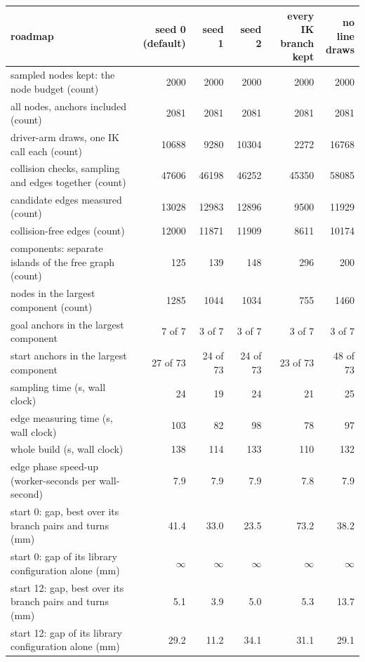 \begin{tabular}{@{}>{\raggedright\arraybackslash}p{6.2cm} rrrrr@{}}
\toprule
roadmap & \shortstack{seed 0\\(default)} & seed 1 & seed 2 & \shortstack{every IK\\branch kept} & \shortstack{no line\\draws} \\
\midrule
sampled nodes kept: the node budget (count) & 2000 & 2000 & 2000 & 2000 & 2000 \\
all nodes, anchors included (count) & 2081 & 2081 & 2081 & 2081 & 2081 \\
driver-arm draws, one IK call each (count) & 10688 & 9280 & 10304 & 2272 & 16768 \\
collision checks, sampling and edges together (count) & 47606 & 46198 & 46252 & 45350 & 58085 \\
candidate edges measured (count) & 13028 & 12983 & 12896 & 9500 & 11929 \\
collision-free edges (count) & 12000 & 11871 & 11909 & 8611 & 10174 \\
components: separate islands of the free graph (count) & 125 & 139 & 148 & 296 & 200 \\
nodes in the largest component (count) & 1285 & 1044 & 1034 & 755 & 1460 \\
goal anchors in the largest component & 7 of 7 & 3 of 7 & 3 of 7 & 3 of 7 & 3 of 7 \\
start anchors in the largest component & 27 of 73 & 24 of 73 & 24 of 73 & 23 of 73 & 48 of 73 \\
\midrule
sampling time (s, wall clock) & 24 & 19 & 24 & 21 & 25 \\
edge measuring time (s, wall clock) & 103 & 82 & 98 & 78 & 97 \\
whole build (s, wall clock) & 138 & 114 & 133 & 110 & 132 \\
edge phase speed-up (worker-seconds per wall-second) & 7.9 & 7.9 & 7.9 & 7.8 & 7.9 \\
\midrule
start 0: gap, best over its branch pairs and turns (mm) & 41.4 & 33.0 & 23.5 & 73.2 & 38.2 \\
start 0: gap of its library configuration alone (mm) & $\infty$ & $\infty$ & $\infty$ & $\infty$ & $\infty$ \\
start 12: gap, best over its branch pairs and turns (mm) & 5.1 & 3.9 & 5.0 & 5.3 & 13.7 \\
start 12: gap of its library configuration alone (mm) & 29.2 & 11.2 & 34.1 & 31.1 & 29.1 \\

\end{tabular}
